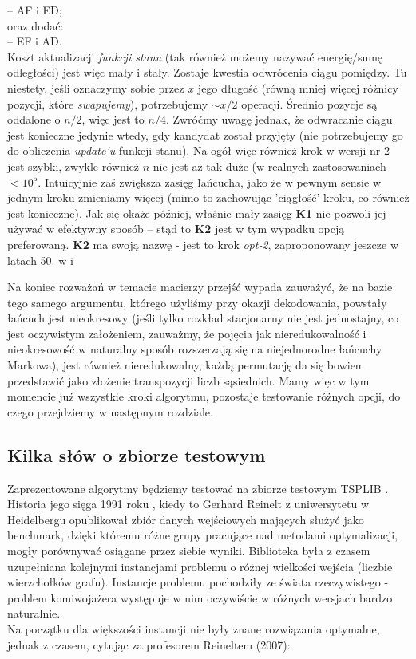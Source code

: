 \documentclass[a4paper]{article}
\theoremstyle{defn}
\theoremstyle{theorem}
\theoremstyle{lemma}
\theoremstyle{cor}
\theoremstyle{fact}
\begin{document}
\begin{enumerate}
– AF i ED;\\
oraz dodać:\\
– EF i AD.\\
Koszt aktualizacji \textit{funkcji stanu} (tak również możemy nazywać energię/sumę odległości) jest więc mały i stały. Zostaje kwestia odwrócenia ciągu pomiędzy. Tu niestety, jeśli oznaczymy sobie przez $x$ jego długość (równą mniej więcej różnicy pozycji, które \textit{swapujemy}), potrzebujemy $\sim x/2$ operacji. Średnio pozycje są oddalone o $n/2$, więc jest to $n/4$. Zwróćmy uwagę jednak, że odwracanie ciągu jest konieczne jedynie wtedy, gdy kandydat został przyjęty (nie potrzebujemy go do obliczenia \textit{update'u} funkcji stanu). Na ogół więc również krok w wersji nr 2 jest szybki, zwykle również $n$ nie jest aż tak duże (w realnych zastosowaniach $<10^5$. Intuicyjnie zaś zwiększa zasięg łańcucha, jako że w pewnym sensie w jednym kroku zmieniamy więcej (mimo to zachowując 'ciągłość' kroku, co również jest konieczne). Jak się okaże później, właśnie mały zasięg \textbf{K1}  nie pozwoli jej używać w efektywny sposób – stąd to \textbf{K2} jest w tym wypadku opcją preferowaną.
\textbf{K2} ma swoją nazwę - jest to krok \textit{opt-2}, zaproponowany jeszcze w latach 50. w \cite{2opt1} i \cite{2opt2}
\end{enumerate}
Na koniec rozważań w temacie macierzy przejść wypada zauważyć, że na bazie tego samego argumentu, którego użyliśmy przy okazji dekodowania, powstały łańcuch jest nieokresowy (jeśli tylko rozkład stacjonarny nie jest jednostajny, co jest oczywistym założeniem, zauważmy, że pojęcia jak nieredukowalność i nieokresowość w naturalny sposób rozszerzają się na niejednorodne łańcuchy Markowa), jest również nieredukowalny, każdą permutację da się bowiem przedstawić jako złożenie transpozycji liczb sąsiednich.
Mamy więc w tym momencie już wszystkie kroki algorytmu, pozostaje testowanie różnych opcji, do czego przejdziemy w następnym rozdziale.

\subsection{Kilka słów o zbiorze testowym}
Zaprezentowane algorytmy będziemy testować na zbiorze testowym TSPLIB \cite{benchmark}. Historia jego sięga 1991 roku \cite{reinh}, kiedy to Gerhard Reinelt z uniwersytetu w Heidelbergu opublikował zbiór danych wejściowych mających służyć jako benchmark, dzięki któremu różne grupy pracujące nad metodami optymalizacji, mogły porównywać osiągane przez siebie wyniki. Biblioteka była z czasem uzupełniana kolejnymi instancjami problemu o różnej wielkości wejścia (liczbie wierzchołków grafu). Instancje problemu pochodziły ze świata rzeczywistego - problem komiwojażera występuje w nim oczywiście w różnych wersjach bardzo naturalnie. \\
Na początku dla większości instancji nie były znane rozwiązania optymalne, jednak z czasem, cytując za profesorem Reineltem (2007):
\end{document}
